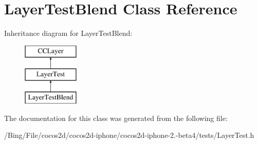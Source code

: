 \hypertarget{interface_layer_test_blend}{\section{Layer\-Test\-Blend Class Reference}
\label{interface_layer_test_blend}
}
Inheritance diagram for Layer\-Test\-Blend\-:\begin{figure}[H]
\begin{center}
\leavevmode
\includegraphics[height=3.000000cm]{interface_layer_test_blend}
\end{center}
\end{figure}


The documentation for this class was generated from the following file\-:\begin{DoxyCompactItemize}
\item 
/\-Bing/\-File/cocos2d/cocos2d-\/iphone/cocos2d-\/iphone-\/2.-\/beta4/tests/Layer\-Test.\-h\end{DoxyCompactItemize}
